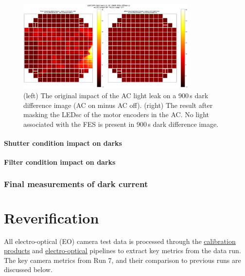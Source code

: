\begin{figure}
\begin{centering}
\includegraphics[width=0.8\textwidth]{figures/AC_LightLeak_study.png}
\caption{ (left) The original impact of the AC light leak on a 900\,s dark difference image (AC on minus AC off). (right) The result after masking the LEDsc of the motor encoders in the AC.  No light associated with the FES is present in 900\,s dark difference image.  \label{fig:ac-light-leak}}
\end{centering}
\end{figure}

\paragraph{Shutter condition impact on
darks}\label{shutter-condition-impact-on-darks}

\paragraph{Filter condition impact on
darks}\label{filter-condition-impact-on-darks}

\subsubsection{Final measurements of dark
current}\label{final-measurements-of-dark-current}

\section{Reverification}\label{reverification}

All electro-optical (EO) camera test data is processed through the
\underline{\href{https://github.com/lsst/cp_pipe/tree/main}{calibration products}} and
\underline{\href{https://github.com/lsst-camera-dh/eo_pipe/tree/main}{electro-optical}}
pipelines to extract key metrics from the data run. The key camera
metrics from Run 7, and their comparison to previous runs are discussed
below.

